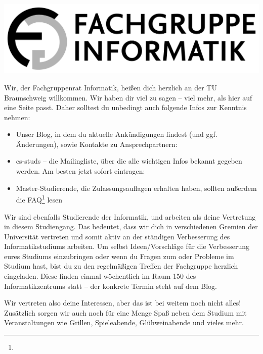 \documentclass[
  final,
  a4paper,              %
  style=screen,
  nexus,                %
]{tubsartcl}
\begin{document}
\pagestyle{empty}


\begin{center}
\noindent\includegraphics[width=.5\textwidth]{bilder/fg-logo/fg-logo.pdf}
\end{center}

\listoftodos

\begin{multicols}{2}

\noindent{}Wir, der Fachgruppenrat Informatik, heißen dich herzlich an der TU Braunschweig willkommen. 
Wir haben dir viel zu sagen – viel mehr, als hier auf eine Seite passt. Daher solltest du unbedingt auch folgende Infos zur Kenntnis nehmen:

\begin{itemize}[topsep=0em,itemsep=-1ex,partopsep=0em,parsep=1ex]
\item Unser Blog, in dem du aktuelle Ankündigungen findest (und ggf. Änderungen), sowie Kontakte zu Ansprechpartnern: \\\fginfoUrl

\item cs-studs -- die Mailingliste, über die alle wichtigen Infos bekannt gegeben werden. Am besten jetzt sofort eintragen: \\

\item Master-Studierende, die Zulassungsauflagen erhalten haben, sollten außerdem die FAQ\footnote{} lesen
\end{itemize}

\noindent{}Wir sind ebenfalls Studierende der Informatik, und arbeiten als deine Vertretung in diesem Studiengang. Das bedeutet, dass wir dich in verschiedenen Gremien der Universität vertreten und somit aktiv an der ständigen Verbesserung des Informatikstudiums arbeiten. Um selbst Ideen/Vorschläge für die Verbesserung eures Studiums einzubringen oder wenn du Fragen zum oder Probleme im Studium hast, bist du zu den regelmäßigen Treffen der Fachgruppe herzlich eingeladen. Diese finden einmal wöchentlich im Raum 150 des Informatikzentrums statt – der konkrete Termin steht auf dem Blog.

Wir vertreten also deine Interessen, aber das ist bei weitem noch nicht alles! Zusätzlich sorgen wir auch noch für eine Menge Spaß neben dem Studium mit Veranstaltungen wie Grillen, Spieleabende, Glühweinabende und vieles mehr.


\end{multicols}
\end{document}
